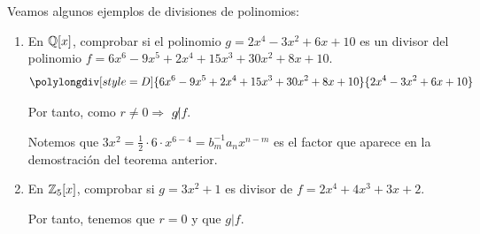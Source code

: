 \begin{ejemplo} Veamos algunos ejemplos de divisiones de polinomios:
\begin{enumerate}
    \item En $\mathbb Q[x]$, comprobar si el polinomio $g=2x^4-3x^2+6x+10$ es un divisor del polinomio $f=6x^6-9x^5+2x^4+15x^3+30x^2+8x+10$.
    \begin{equation*}
        \polylongdiv[style=D]{6x^6-9x^5+2x^4+15x^3+30x^2+8x+10}{2x^4-3x^2+6x+10}
    \end{equation*}

    Por tanto, como $r\neq0 \Longrightarrow$ $g\not|f$.

    Notemos que $3x^2=\frac{1}{2}\cdot 6 \cdot x^{6-4} = b_m^{-1}a_nx^{n-m}$ es el factor que aparece en la demostración del teorema anterior.
    
    \item En $\mathbb Z_5[x]$, comprobar si $g=3x^2+1$ es divisor de $f=2x^4+4x^3+3x+2$.
    \begin{center}
    \end{center}
    
    Por tanto, tenemos que $r=0$ y que $g|f$.
\end{enumerate}
\end{ejemplo}

